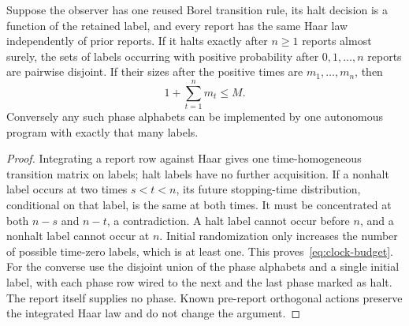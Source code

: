 \begin{lemma}\label{lem:clock}
Suppose the observer has one reused Borel transition rule, its halt decision is a function of the retained label, and every report has the same Haar law independently of prior reports. If it halts exactly after $n\ge1$ reports almost surely, the sets of labels occurring with positive probability after $0,1,\ldots,n$ reports are pairwise disjoint. If their sizes after the positive times are $m_1,\ldots,m_n$, then
\begin{equation}\label{eq:clock-budget}
 1+\sum_{t=1}^n m_t\le M.
\end{equation}
Conversely any such phase alphabets can be implemented by one autonomous program with exactly that many labels.
\end{lemma}
\begin{proof}
Integrating a report row against Haar gives one time-homogeneous transition matrix on labels; halt labels have no further acquisition. If a nonhalt label occurs at two times $s<t<n$, its future stopping-time distribution, conditional on that label, is the same at both times. It must be concentrated at both $n-s$ and $n-t$, a contradiction. A halt label cannot occur before $n$, and a nonhalt label cannot occur at $n$. Initial randomization only increases the number of possible time-zero labels, which is at least one. This proves~\eqref{eq:clock-budget}. For the converse use the disjoint union of the phase alphabets and a single initial label, with each phase row wired to the next and the last phase marked as halt. The report itself supplies no phase. Known pre-report orthogonal actions preserve the integrated Haar law and do not change the argument.
\end{proof}

